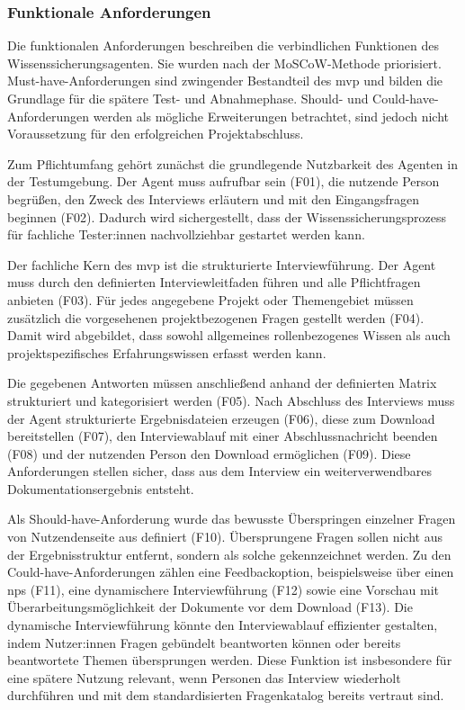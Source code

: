 \documentclass[
  10pt,
  ngerman,
  a4paper,
  toc=graduated,
  numbers=noenddot,
  headings=standardclasses,
  nonumberlist
]{scrartcl}
\begin{document}
\subsubsection{Funktionale Anforderungen}
\label{funktionale_anforderungen}

Die funktionalen Anforderungen beschreiben die verbindlichen Funktionen des Wissenssicherungsagenten. Sie wurden nach der MoSCoW-Methode priorisiert. Must-have-Anforderungen sind zwingender Bestandteil des \gls{mvp} und bilden die Grundlage für die spätere Test- und Abnahmephase. Should- und Could-have-Anforderungen werden als mögliche Erweiterungen betrachtet, sind jedoch nicht Voraussetzung für den erfolgreichen Projektabschluss.

Zum Pflichtumfang gehört zunächst die grundlegende Nutzbarkeit des Agenten in der Testumgebung. Der Agent muss aufrufbar sein (F01), die nutzende Person begrüßen, den Zweck des Interviews erläutern und mit den Eingangsfragen beginnen (F02). Dadurch wird sichergestellt, dass der Wissenssicherungsprozess für fachliche Tester:innen nachvollziehbar gestartet werden kann.

Der fachliche Kern des \gls{mvp} ist die strukturierte Interviewführung. Der Agent muss durch den definierten Interviewleitfaden führen und alle Pflichtfragen anbieten (F03). Für jedes angegebene Projekt oder Themengebiet müssen zusätzlich die vorgesehenen projektbezogenen Fragen gestellt werden (F04). Damit wird abgebildet, dass sowohl allgemeines rollenbezogenes Wissen als auch projektspezifisches Erfahrungswissen erfasst werden kann.

Die gegebenen Antworten müssen anschließend anhand der definierten Matrix strukturiert und kategorisiert werden (F05). Nach Abschluss des Interviews muss der Agent strukturierte Ergebnisdateien erzeugen (F06), diese zum Download bereitstellen (F07), den Interviewablauf mit einer Abschlussnachricht beenden (F08) und der nutzenden Person den Download ermöglichen (F09). Diese Anforderungen stellen sicher, dass aus dem Interview ein weiterverwendbares Dokumentationsergebnis entsteht.

Als Should-have-Anforderung wurde das bewusste Überspringen einzelner Fragen von Nutzendenseite aus definiert (F10). Übersprungene Fragen sollen nicht aus der Ergebnisstruktur entfernt, sondern als solche gekennzeichnet werden. Zu den Could-have-Anforderungen zählen eine Feedbackoption, beispielsweise über einen \gls{nps} (F11), eine dynamischere Interviewführung (F12) sowie eine Vorschau mit Überarbeitungsmöglichkeit der Dokumente vor dem Download (F13). Die dynamische Interviewführung könnte den Interviewablauf effizienter gestalten, indem Nutzer:innen Fragen gebündelt beantworten können oder bereits beantwortete Themen übersprungen werden. Diese Funktion ist insbesondere für eine spätere Nutzung relevant, wenn Personen das Interview wiederholt durchführen und mit dem standardisierten Fragenkatalog bereits vertraut sind.
\end{document}
